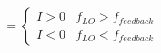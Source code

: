 \documentclass[preview]{standalone}
\begin{document}
\begin{align*}
= \begin{cases} I > 0 & f_{LO} > f_{feedback} \\ I < 0 & f_{LO} < f_{feedback} \end{cases}
\end{align*}
\end{document}
